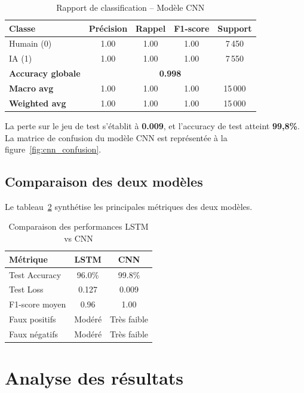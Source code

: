 \begin{table}[h]
\centering
\label{tab:cnn_results}
\begin{tabular}{lcccc}
\hline
\textbf{Classe} & \textbf{Précision} & \textbf{Rappel} & \textbf{F1-score} & \textbf{Support} \\
\hline
Humain (0)      & 1.00 & 1.00 & 1.00 & 7\,450 \\
IA (1)          & 1.00 & 1.00 & 1.00 & 7\,550 \\
\hline
\textbf{Accuracy globale} & \multicolumn{4}{c}{\textbf{0.998}} \\
\textbf{Macro avg}        & 1.00 & 1.00 & 1.00 & 15\,000 \\
\textbf{Weighted avg}     & 1.00 & 1.00 & 1.00 & 15\,000 \\
\hline
\end{tabular}
\caption{Rapport de classification -- Modèle CNN}
\end{table}

La perte sur le jeu de test s'établit à \textbf{0.009}, et l'accuracy de test atteint
\textbf{99{,}8\%}. La matrice de confusion du modèle CNN est représentée à la
figure~\ref{fig:cnn_confusion}.

\subsection{Comparaison des deux modèles}

Le tableau~\ref{tab:comparison} synthétise les principales métriques des deux modèles.

\begin{table}[h]
\centering
\label{tab:comparison}
\begin{tabular}{lcc}
\hline
\textbf{Métrique}      & \textbf{LSTM} & \textbf{CNN} \\
\hline
Test Accuracy          & 96.0\%        & 99.8\%       \\
Test Loss              & 0.127         & 0.009        \\
F1-score moyen         & 0.96          & 1.00         \\
Faux positifs          & Modéré        & Très faible  \\
Faux négatifs          & Modéré        & Très faible  \\
\hline
\end{tabular}
\caption{Comparaison des performances LSTM vs CNN}
\end{table}

\section{Analyse des résultats}

